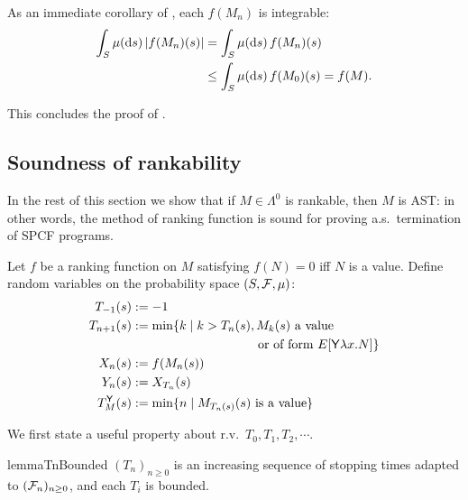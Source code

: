 As an immediate corollary of , each $f(M_n)$ is integrable:
\begin{align*}
\int_{S} \mu(\mathrm{d} s) \, |f(M_n)(s)| 
&=
\int_{S} \mu(\mathrm{d} s) \, f(M_n)(s)
\\
&\leq
\int_{S} \mu(\mathrm{d} s) \, f(M_0)(s)
=
f(M).
\end{align*}

\iffalse
[** To see $f_{2, n+1}(M) \leq f(M_n)[T_2]$, take $s \in T_2$. Then $f_{2, n+1}(M)(s) = f(E[\underline{a}])$ and $M_n = E[\tsample]$, for some $a \in [0, 1]$ and evaluation context $E$. Hence 
\[
f_{2, n+1}(M)(s) \leq \int_I f(E[\underline{r}]) \, \mu_{leb}(\textrm{d} r)
\leq f(E[\tsample]) = f(M_n)[T_2](s).
\]
**]
\fi
This concludes the proof of %
. %

\subsection{Soundness of rankability}

In the rest of this section we show that if $M \in \Lambda^0$ is rankable, then $M$ is AST: in other words, the method of ranking function is sound for proving a.s.~termination of SPCF programs.

Let $f$ be a ranking function on $M$ satisfying $f(N) = 0$ iff $N$ is a value.
Define random variables on the probability space $(S, \mathcal{F}, \mu)$:
\begin{align}
T_{-1}(s) & := -1 \nonumber \\
T_{n+1}(s) & := \min \{ k \mid k>T_n(s), M_k(s) \textrm{ a value} \nonumber\\
& \qquad\qquad\qquad\qquad\qquad \hbox{or of form } E[\tY \lambda x. N] \} \nonumber \\
X_n(s) & := f(M_n(s)) \nonumber \\
Y_n(s) & := X_{T_n}(s) \nonumber \\
T_M^\tY(s) &:= \min \set{n \mid M_{T_n(s)}(s) \textrm{ is a value}} \label{eq:y stopping time} 
\end{align}



We first state a useful property about r.v.~$T_0, T_1, T_2, \cdots$.
\begin{restatable}{lemma}{TnBounded}
\label{lem:TnBounded}
$(T_n)_{n \geq 0}$ is an increasing sequence of stopping times adapted to $(\mathcal{F}_n)_{n \geq 0}$, and each $T_i$ is bounded.
\end{restatable}

